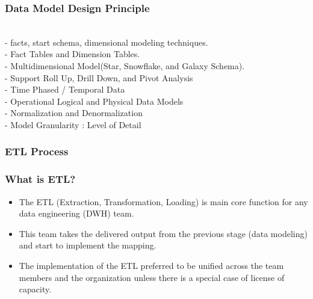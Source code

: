 \begin{frame}
\frametitle{Data Model Design Principle }
\\
- facts, start schema, dimensional modeling techniques.\\
- Fact Tables and Dimension Tables. \\
- Multidimensional Model(Star, Snowflake, and Galaxy Schema).\\
- Support Roll Up, Drill Down, and Pivot Analysis\\
- Time Phased / Temporal Data \\
- Operational Logical and Physical Data Models\\
- Normalization and Denormalization\\
- Model Granularity : Level of Detail\\


\end{frame}

\subsubsection{ETL Process}

\begin{frame}
\frametitle{What is ETL?}

\begin{itemize}[<+->]
	\item The ETL (Extraction, Transformation, Loading) is main core function for any data engineering (DWH) team.
	\item This team takes the delivered output from the previous stage (data modeling) and start to implement the mapping.
	\item The implementation of the ETL preferred to be unified across the team members and the organization unless there is a special case of license of capacity.
	
\end{itemize}		


\end{frame}

